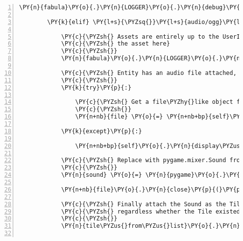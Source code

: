 \begin{Verbatim}[commandchars=\\\{\},numbers=left,firstnumber=1,stepnumber=1]
            \PY{n}{fabula}\PY{o}{.}\PY{n}{LOGGER}\PY{o}{.}\PY{n}{debug}\PY{p}{(}\PY{l+s}{\PYZsq{}}\PY{l+s}{tile already has an audio asset: \PYZob{}\PYZcb{}}\PY{l+s}{\PYZsq{}}\PY{o}{.}\PY{n}{format}\PY{p}{(}\PY{n}{tile\PYZus{}from\PYZus{}list}\PY{p}{)}\PY{p}{)}

        \PY{k}{elif} \PY{l+s}{\PYZsq{}}\PY{l+s}{audio/ogg}\PY{l+s}{\PYZsq{}} \PY{o+ow}{in} \PY{n}{event}\PY{o}{.}\PY{n}{tile}\PY{o}{.}\PY{n}{assets}\PY{o}{.}\PY{n}{keys}\PY{p}{(}\PY{p}{)}\PY{p}{:}

            \PY{c}{\PYZsh{} Assets are entirely up to the UserInterface, so we fetch}
            \PY{c}{\PYZsh{} the asset here}
            \PY{c}{\PYZsh{}}
            \PY{n}{fabula}\PY{o}{.}\PY{n}{LOGGER}\PY{o}{.}\PY{n}{debug}\PY{p}{(}\PY{l+s}{\PYZsq{}}\PY{l+s}{no asset for \PYZob{}\PYZcb{}, attempting to fetch}\PY{l+s}{\PYZsq{}}\PY{o}{.}\PY{n}{format}\PY{p}{(}\PY{n}{tile\PYZus{}from\PYZus{}list}\PY{p}{)}\PY{p}{)}

            \PY{c}{\PYZsh{} Entity has an audio file attached, fetch the asset}
            \PY{c}{\PYZsh{}}
            \PY{k}{try}\PY{p}{:}

                \PY{c}{\PYZsh{} Get a file\PYZhy{}like object from asset manager}
                \PY{c}{\PYZsh{}}
                \PY{n+nb}{file} \PY{o}{=} \PY{n+nb+bp}{self}\PY{o}{.}\PY{n}{assets}\PY{o}{.}\PY{n}{fetch}\PY{p}{(}\PY{n}{tile\PYZus{}from\PYZus{}list}\PY{o}{.}\PY{n}{assets}\PY{p}{[}\PY{l+s}{\PYZsq{}}\PY{l+s}{audio/ogg}\PY{l+s}{\PYZsq{}}\PY{p}{]}\PY{o}{.}\PY{n}{uri}\PY{p}{)}

            \PY{k}{except}\PY{p}{:}

                \PY{n+nb+bp}{self}\PY{o}{.}\PY{n}{display\PYZus{}asset\PYZus{}exception}\PY{p}{(}\PY{n}{event}\PY{o}{.}\PY{n}{entity}\PY{o}{.}\PY{n}{assets}\PY{p}{[}\PY{l+s}{\PYZsq{}}\PY{l+s}{audio/ogg}\PY{l+s}{\PYZsq{}}\PY{p}{]}\PY{o}{.}\PY{n}{uri}\PY{p}{)}

            \PY{c}{\PYZsh{} Replace with pygame.mixer.Sound from file}
            \PY{c}{\PYZsh{}}
            \PY{n}{sound} \PY{o}{=} \PY{n}{pygame}\PY{o}{.}\PY{n}{mixer}\PY{o}{.}\PY{n}{Sound}\PY{p}{(}\PY{n+nb}{file}\PY{p}{)}

            \PY{n+nb}{file}\PY{o}{.}\PY{n}{close}\PY{p}{(}\PY{p}{)}

            \PY{c}{\PYZsh{} Finally attach the Sound as the Tile\PYZsq{}s asset, update sound}
            \PY{c}{\PYZsh{} regardless whether the Tile existed or not}
            \PY{c}{\PYZsh{}}
            \PY{n}{tile\PYZus{}from\PYZus{}list}\PY{o}{.}\PY{n}{assets}\PY{p}{[}\PY{l+s}{\PYZsq{}}\PY{l+s}{audio/ogg}\PY{l+s}{\PYZsq{}}\PY{p}{]}\PY{o}{.}\PY{n}{data} \PY{o}{=} \PY{n}{sound}


\end{Verbatim}
